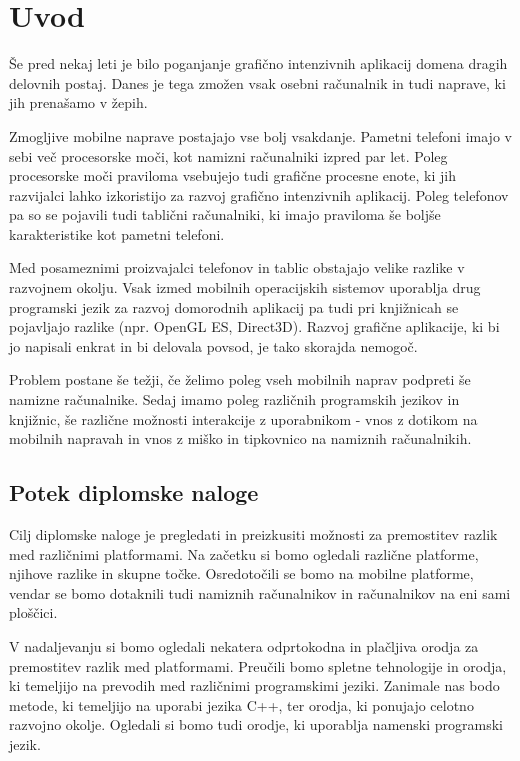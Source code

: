 \chapter{Uvod}

Še pred nekaj leti je bilo poganjanje grafično intenzivnih aplikacij domena dragih delovnih postaj. Danes je tega zmožen vsak osebni računalnik in tudi naprave, ki jih prenašamo v žepih.

Zmogljive mobilne naprave postajajo vse bolj vsakdanje. Pametni telefoni imajo v sebi več procesorske moči, kot namizni računalniki izpred par let. Poleg procesorske moči praviloma vsebujejo tudi grafične procesne enote, ki jih razvijalci lahko izkoristijo za razvoj grafično intenzivnih aplikacij. Poleg telefonov pa so se pojavili tudi tablični računalniki, ki imajo praviloma še boljše karakteristike kot pametni telefoni. 

Med posameznimi proizvajalci telefonov in tablic obstajajo velike razlike v razvojnem okolju. Vsak izmed mobilnih operacijskih sistemov uporablja drug programski jezik za razvoj domorodnih aplikacij pa tudi pri knjižnicah se pojavljajo razlike (npr. OpenGL ES, Direct3D). Razvoj grafične aplikacije, ki bi jo napisali enkrat in bi delovala povsod, je tako skorajda nemogoč.

Problem postane še težji, če želimo poleg vseh mobilnih naprav podpreti še namizne računalnike. Sedaj imamo poleg različnih programskih jezikov in knjižnic, še različne možnosti interakcije z uporabnikom - vnos z dotikom na mobilnih napravah in vnos z miško in tipkovnico na namiznih računalnikih.

\section{Potek diplomske naloge}

Cilj diplomske naloge je pregledati in preizkusiti možnosti za premostitev razlik med različnimi platformami. Na začetku si bomo ogledali različne platforme, njihove razlike in skupne točke. Osredotočili se bomo na mobilne platforme, vendar se bomo dotaknili tudi namiznih računalnikov in računalnikov na eni sami ploščici.

V nadaljevanju si bomo ogledali nekatera odprtokodna in plačljiva orodja za premostitev razlik med platformami. Preučili bomo spletne tehnologije in orodja, ki temeljijo na prevodih med različnimi programskimi jeziki. Zanimale nas bodo metode, ki temeljijo na uporabi jezika C++, ter orodja, ki ponujajo celotno razvojno okolje. Ogledali si bomo tudi orodje, ki uporablja namenski programski jezik.

